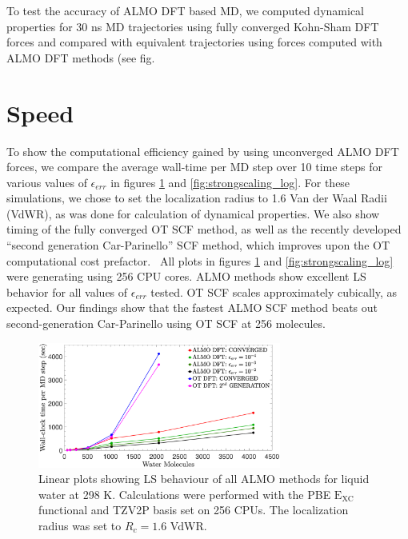 \documentclass[10pt,aps,prl,twocolumn,amsmath,amssymb,superscriptaddress,longbibliography]{revtex4-1}
\begin{document}
To test the accuracy of ALMO DFT based MD, we computed dynamical properties for 30 ns MD trajectories using fully converged Kohn-Sham DFT forces and compared with equivalent trajectories using forces computed with ALMO DFT methods (see fig. %

\section{Speed}

To show the computational efficiency gained by using unconverged ALMO DFT forces, we compare the average wall-time per MD step over 10 time steps for various values of $\epsilon_{err}$ in figures \ref{fig:strongscaling_linear} and \ref{fig:strongscaling_log}.
For these simulations, we chose to set the localization radius to 1.6 Van der Waal Radii (VdWR), as was done for calculation of dynamical properties.
We also show timing of the fully converged OT SCF method, as well as the recently developed ``second generation Car-Parinello'' SCF method, which improves upon the OT computational cost prefactor.~\cite{a:2ndcpmd}
All plots in figures \ref{fig:strongscaling_linear} and \ref{fig:strongscaling_log} were generating using 256 CPU cores. 
ALMO methods show excellent LS behavior for all values of $\epsilon_{err}$ tested.
OT SCF scales approximately cubically, as expected.
Our findings show that the fastest ALMO SCF method beats out second-generation Car-Parinello using OT SCF at 256 molecules.


\begin{figure}
\includegraphics[trim={1.9cm 0.4cm 3.5cm 1.7cm},clip,width=8cm]{strongscaling_linear.eps}
\caption{\label{fig:strongscaling_linear} Linear plots showing LS behaviour of all ALMO methods for liquid water at 298 K. 
Calculations were performed with the PBE $\mathrm{E_{XC}}$ functional and TZV2P basis set on 256 CPUs. 
The localization radius was set to $R_{c} = 1.6$ VdWR.}
\end{figure}
\end{document}
